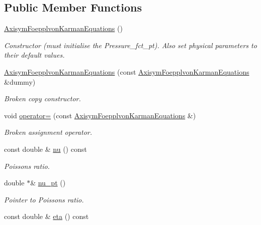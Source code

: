 \subsection*{Public Member Functions}
\begin{DoxyCompactItemize}
\item 
\hyperlink{classoomph_1_1AxisymFoepplvonKarmanEquations_a73d54781a9dbf02beb79ccfeb5cc34e2}{Axisym\+Foepplvon\+Karman\+Equations} ()
\begin{DoxyCompactList}\small\item\em Constructor (must initialise the Pressure\+\_\+fct\+\_\+pt). Also set physical parameters to their default values. \end{DoxyCompactList}\item 
\hyperlink{classoomph_1_1AxisymFoepplvonKarmanEquations_acd3d7267a7be9c94ff44fad533806e57}{Axisym\+Foepplvon\+Karman\+Equations} (const \hyperlink{classoomph_1_1AxisymFoepplvonKarmanEquations}{Axisym\+Foepplvon\+Karman\+Equations} \&dummy)
\begin{DoxyCompactList}\small\item\em Broken copy constructor. \end{DoxyCompactList}\item 
void \hyperlink{classoomph_1_1AxisymFoepplvonKarmanEquations_aaac38681e3450e4c9159e9b0c1b39b85}{operator=} (const \hyperlink{classoomph_1_1AxisymFoepplvonKarmanEquations}{Axisym\+Foepplvon\+Karman\+Equations} \&)
\begin{DoxyCompactList}\small\item\em Broken assignment operator. \end{DoxyCompactList}\item 
const double \& \hyperlink{classoomph_1_1AxisymFoepplvonKarmanEquations_af9e39f4e7643aaecc50d3535ac976f35}{nu} () const
\begin{DoxyCompactList}\small\item\em Poisson\textquotesingle{}s ratio. \end{DoxyCompactList}\item 
double $\ast$\& \hyperlink{classoomph_1_1AxisymFoepplvonKarmanEquations_a10ca08ff9306d643f6ffb0f644ab2cbc}{nu\+\_\+pt} ()
\begin{DoxyCompactList}\small\item\em Pointer to Poisson\textquotesingle{}s ratio. \end{DoxyCompactList}\item 
const double \& \hyperlink{classoomph_1_1AxisymFoepplvonKarmanEquations_a89a897222e4a40e2d258f4e95eb4ceeb}{eta} () const

\end{DoxyCompactItemize}
